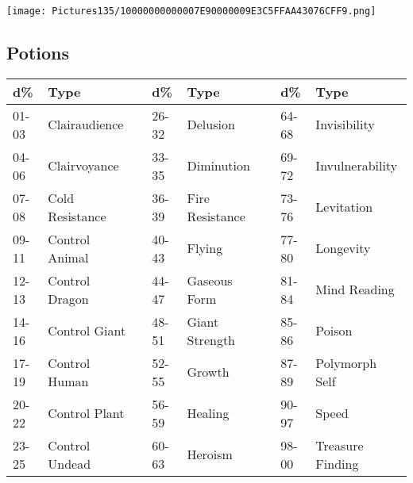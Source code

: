 \documentclass[a4paper,twoside,openany,10pt]{book}
\begin{document}
\vfill

 \texttt{[image: Pictures135/10000000000007E90000009E3C5FFAA43076CFF9.png]}  

\pagebreak

\subsection{Potions}\label{potions}

\begin{tabular*}{1\linewidth}{@{\extracolsep{\fill}}llllllll}
\textbf{d\%} & \textbf{Type} & & \textbf{d\%} & \textbf{Type} & & \textbf{d\%} & \textbf{Type} \\\toprule
01-03 & Clairaudience & & 26-32 & Delusion & & 64-68 & Invisibility \\\hline
04-06 & Clairvoyance & & 33-35 & Diminution & & 69-72 &
Invulnerability \\\hline
07-08 & Cold Resistance & & 36-39 & Fire Resistance & & 73-76 &
Levitation \\\hline
09-11 & Control Animal & & 40-43 & Flying & & 77-80 & Longevity \\\hline
12-13 & Control Dragon & & 44-47 & Gaseous Form & & 81-84 & Mind
Reading \\\hline
14-16 & Control Giant & & 48-51 & Giant Strength & & 85-86 & Poison \\\hline
17-19 & Control Human & & 52-55 & Growth & & 87-89 & Polymorph Self \\\hline
20-22 & Control Plant & & 56-59 & Healing & & 90-97 & Speed \\\hline
23-25 & Control Undead & & 60-63 & Heroism & & 98-00 & Treasure
Finding \\\bottomrule
\end{tabular*}
\end{document}
